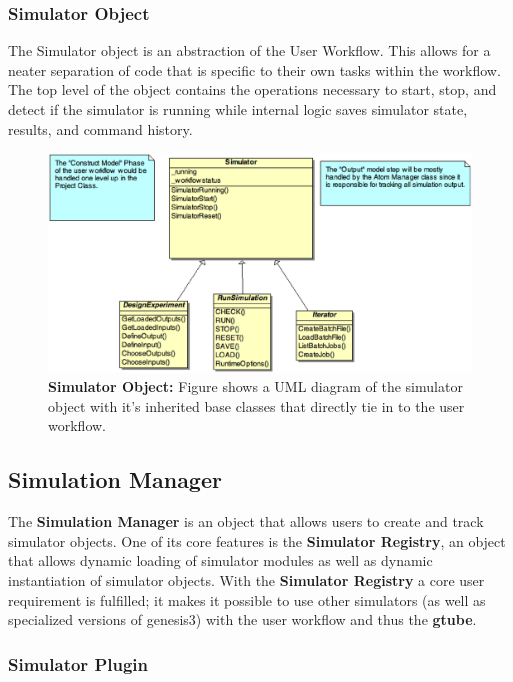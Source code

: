 \documentclass[12pt]{article}
\begin{document}
\subsubsection*{Simulator Object}

	The Simulator object is an abstraction of the User Workflow. This allows for a neater separation of code that is specific to their own tasks within the workflow. The top level of the object contains the operations necessary to start, stop, and detect if the simulator is running while internal logic saves simulator state, results, and command history. 

\begin{figure}[ht]
   \centering
   \includegraphics[scale=0.6]{figures/SimulatorObject.eps}
   \caption{{\bf Simulator Object:} Figure shows a UML diagram of the simulator object with it's inherited base classes that directly tie in to the user workflow.}
   \label{fig:Simulator Object}
\end{figure}


\subsection*{Simulation Manager}

	The {\bf Simulation Manager} is an object that allows users to create and track simulator objects. One of its core features is the {\bf Simulator Registry}, an object that allows dynamic loading of simulator modules as well as dynamic instantiation of simulator objects. With the {\bf Simulator Registry} a core user requirement is fulfilled; it makes it possible to use other simulators (as well as specialized versions of genesis3) with the user workflow and thus the {\bf gtube}. 
	
\subsubsection*{Simulator Plugin}
\end{document}
